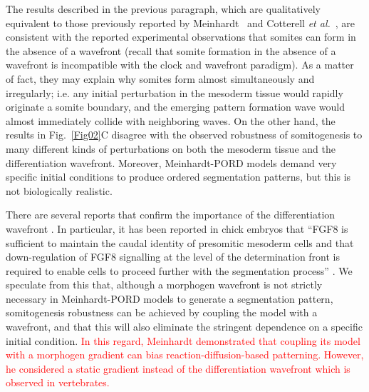 \documentclass[%
 preprint,
 aip, 
 amsmath,amssymb,
]{revtex4-2}
\begin{document}
The results described in the previous paragraph, which are qualitatively equivalent to those previously reported by Meinhardt~\cite{Meinhardt1982} and Cotterell \emph{et al.}~\citep{Cotterell2015}, are consistent with the reported experimental observations that somites can form in the absence of a wavefront (recall that somite formation in the absence of a wavefront is incompatible with the clock and wavefront paradigm). As a matter of fact, they may explain why somites form almost simultaneously and irregularly; i.e. any initial perturbation in the mesoderm tissue would rapidly originate a somite boundary, and the emerging pattern formation wave would almost immediately collide with neighboring waves. On the other hand, the results in Fig.~\ref{Fig02}C disagree with the observed robustness of somitogenesis to many different kinds of perturbations on both the mesoderm tissue and the differentiation wavefront. Moreover, Meinhardt-PORD models demand very specific initial conditions to produce ordered segmentation patterns, but this is not biologically realistic. 

There are several reports that confirm the importance of the differentiation wavefront \cite{Naiche2011, Sawada2001}. In particular, it has been reported in chick embryos that ``FGF8 is sufficient to maintain the caudal identity of presomitic mesoderm cells and that down-regulation of FGF8 signalling at the level of the determination front is required to enable cells to proceed further with the segmentation process'' \cite{Dubrulle2001}. We speculate from this that, although a morphogen wavefront is not strictly necessary in Meinhardt-PORD models to generate a segmentation pattern, somitogenesis robustness can be achieved by coupling the model with a wavefront, and that this will also eliminate the stringent dependence on a specific initial condition. \textcolor{red}{In this regard, Meinhardt \cite{Meinhardt1982} demonstrated that coupling its model with a morphogen gradient can bias reaction-diffusion-based patterning. However, he considered a static gradient instead of the differentiation wavefront which is observed in vertebrates.} 
	
\end{document}
